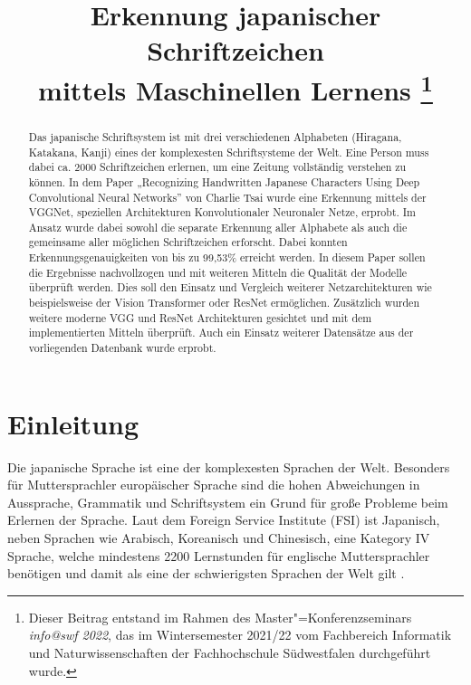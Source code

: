 \documentclass[twoside,a4paper]{IEEEtran}
\begin{document}
\title{Erkennung japanischer Schriftzeichen \\mittels Maschinellen Lernens%
    \thanks{%
    Dieser Beitrag entstand im 
    Rahmen des Master"=Konferenzseminars \emph{info@swf 2022}, das im
    Wintersemester 2021/22 vom Fachbereich Informatik und
    Naturwissenschaften der Fachhochschule Südwestfalen
    durchgeführt wurde.}}
\author{
}

\maketitle


\begin{abstract}
Das japanische Schriftsystem ist mit drei verschiedenen Alphabeten (Hiragana, Katakana, Kanji) eines der komplexesten Schriftsysteme der Welt. Eine Person muss dabei ca. 2000 Schriftzeichen erlernen, um eine Zeitung vollständig verstehen zu können. In dem Paper „Recognizing Handwritten Japanese Characters Using Deep Convolutional Neural Networks” von Charlie Tsai wurde eine Erkennung mittels der VGGNet, speziellen Architekturen Konvolutionaler Neuronaler Netze, erprobt. Im Ansatz wurde dabei sowohl die separate Erkennung aller Alphabete als auch die gemeinsame aller möglichen Schriftzeichen erforscht. Dabei konnten Erkennungsgenauigkeiten von bis zu 99,53\% erreicht werden. In diesem Paper sollen die Ergebnisse nachvollzogen und mit weiteren Mitteln die Qualität der Modelle überprüft werden. Dies soll den Einsatz und Vergleich weiterer Netzarchitekturen wie beispielsweise der Vision Transformer oder ResNet ermöglichen. Zusätzlich wurden weitere moderne VGG und ResNet Architekturen gesichtet und mit dem implementierten Mitteln überprüft. Auch ein Einsatz weiterer Datensätze aus der vorliegenden Datenbank wurde erprobt. 
\end{abstract}


\section{Einleitung}
Die japanische Sprache ist eine der komplexesten Sprachen der Welt. Besonders für Muttersprachler europäischer Sprache sind die hohen Abweichungen in Aussprache, Grammatik und Schriftsystem ein Grund für große Probleme beim Erlernen der Sprache. Laut dem Foreign Service Institute (FSI) ist Japanisch, neben Sprachen wie Arabisch, Koreanisch und Chinesisch, eine Kategory IV Sprache, welche mindestens 2200 Lernstunden für englische Muttersprachler benötigen und damit als eine der schwierigsten Sprachen der Welt gilt \cite{FSI}.
\end{document}

